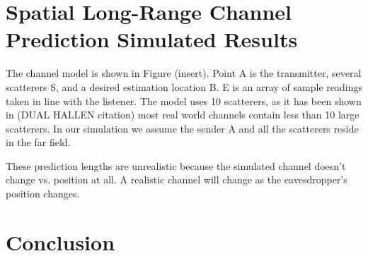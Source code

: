 \documentclass{allertonproc}
\begin{document}






\section{Spatial Long-Range Channel Prediction Simulated Results}\label{simresults}



The channel model is shown in Figure (insert). Point A is the transmitter, several scatterers S, and a desired estimation location B. E is an array of sample readings taken in line with the listener. The model uses 10 scatterers, as it has been shown in (DUAL HALLEN citation) most real world channels contain less than 10 large scatterers. In our simulation we assume the sender A and all the scatterers reside in the far field. 



These prediction lengths are unrealistic because the simulated channel doesn't change vs. position at all.  A realistic channel will change as the eavesdropper's position changes. 

\section{Conclusion}
\end{document}
